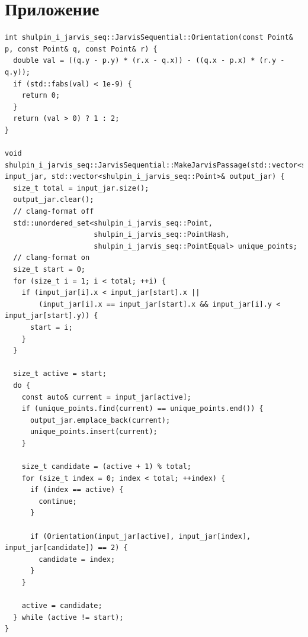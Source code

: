\documentclass[12pt,a4paper]{article}
\begin{document}
\section{Приложение}
\begin{lstlisting}[caption={SEQ-версия алгоритма}]
int shulpin_i_jarvis_seq::JarvisSequential::Orientation(const Point& p, const Point& q, const Point& r) {
  double val = ((q.y - p.y) * (r.x - q.x)) - ((q.x - p.x) * (r.y - q.y));
  if (std::fabs(val) < 1e-9) {
    return 0;
  }
  return (val > 0) ? 1 : 2;
}

void shulpin_i_jarvis_seq::JarvisSequential::MakeJarvisPassage(std::vector<shulpin_i_jarvis_seq::Point>& input_jar, std::vector<shulpin_i_jarvis_seq::Point>& output_jar) {
  size_t total = input_jar.size();
  output_jar.clear();
  // clang-format off
  std::unordered_set<shulpin_i_jarvis_seq::Point, 
                     shulpin_i_jarvis_seq::PointHash, 
                     shulpin_i_jarvis_seq::PointEqual> unique_points;
  // clang-format on
  size_t start = 0;
  for (size_t i = 1; i < total; ++i) {
    if (input_jar[i].x < input_jar[start].x ||
        (input_jar[i].x == input_jar[start].x && input_jar[i].y < input_jar[start].y)) {
      start = i;
    }
  }

  size_t active = start;
  do {
    const auto& current = input_jar[active];
    if (unique_points.find(current) == unique_points.end()) {
      output_jar.emplace_back(current);
      unique_points.insert(current);
    }

    size_t candidate = (active + 1) % total;
    for (size_t index = 0; index < total; ++index) {
      if (index == active) {
        continue;
      }

      if (Orientation(input_jar[active], input_jar[index], input_jar[candidate]) == 2) {
        candidate = index;
      }
    }

    active = candidate;
  } while (active != start);
}
\end{lstlisting}
\end{document}
